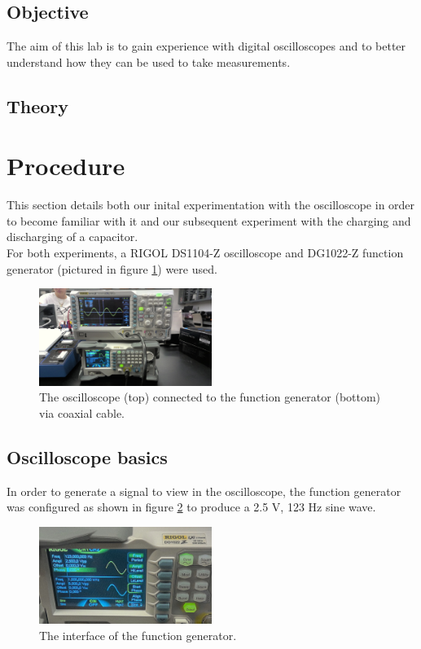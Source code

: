 \documentclass{article}
\begin{document}
    \subsection{Objective}
    The aim of this lab is to gain experience with digital oscilloscopes and to better understand how they can be used to take measurements.

    \subsection{Theory}
    

\section{Procedure}
    This section details both our inital experimentation with the oscilloscope in order to become familiar with it and our subsequent experiment with the charging and discharging of a capacitor.\\ %
    For both experiments, a RIGOL DS1104-Z oscilloscope and DG1022-Z function generator (pictured in figure \ref{oscnfunc1}) were used.

    \begin{figure}
        \centering
        \includegraphics[width=0.5\textwidth]{WIN_20240927_13_48_12_Pro.jpg} %
        \caption{The oscilloscope (top) connected to the function generator (bottom) via coaxial cable.}
        \label{oscnfunc1}
    \end{figure}

    \subsection{Oscilloscope basics}
        In order to generate a signal to view in the oscilloscope, the function generator was configured as shown in figure \ref{funcgen1} to produce a 2.5 V, 123 Hz sine wave.

        \begin{figure}
            \centering
            \includegraphics[width=0.5\textwidth]{WIN_20240927_13_51_59_Pro.jpg}
            \caption{The interface of the function generator.}
            \label{funcgen1}
        \end{figure}
\end{document}
